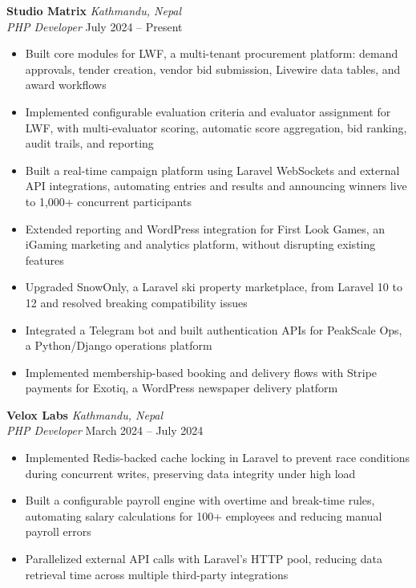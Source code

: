 \documentclass[10pt, a4paper]{article}
\newcommand{\role}[4]{%
    \noindent
    \textbf{#2} \hfill \textit{#3} \\
    \textit{#1} \hfill #4
    \vspace{2pt}
}
\begin{document}
\role{PHP Developer}{Studio Matrix}{Kathmandu, Nepal}{July 2024 -- Present}
\begin{itemize}
    \item Built core modules for LWF, a multi-tenant procurement platform: demand approvals, tender creation, vendor bid submission, Livewire data tables, and award workflows
    \item Implemented configurable evaluation criteria and evaluator assignment for LWF, with multi-evaluator scoring, automatic score aggregation, bid ranking, audit trails, and reporting
    \item Built a real-time campaign platform using Laravel WebSockets and external API integrations, automating entries and results and announcing winners live to 1,000+ concurrent participants
    \item Extended reporting and WordPress integration for First Look Games, an iGaming marketing and analytics platform, without disrupting existing features
    \item Upgraded SnowOnly, a Laravel ski property marketplace, from Laravel 10 to 12 and resolved breaking compatibility issues
    \item Integrated a Telegram bot and built authentication APIs for PeakScale Ops, a Python/Django operations platform
    \item Implemented membership-based booking and delivery flows with Stripe payments for Exotiq, a WordPress newspaper delivery platform
\end{itemize}

\vspace{6pt}

\role{PHP Developer}{Velox Labs}{Kathmandu, Nepal}{March 2024 -- July 2024}
\begin{itemize}
    \item Implemented Redis-backed cache locking in Laravel to prevent race conditions during concurrent writes, preserving data integrity under high load
    \item Built a configurable payroll engine with overtime and break-time rules, automating salary calculations for 100+ employees and reducing manual payroll errors
    \item Parallelized external API calls with Laravel's HTTP pool, reducing data retrieval time across multiple third-party integrations
\end{itemize}

\vspace{6pt}
\end{document}
